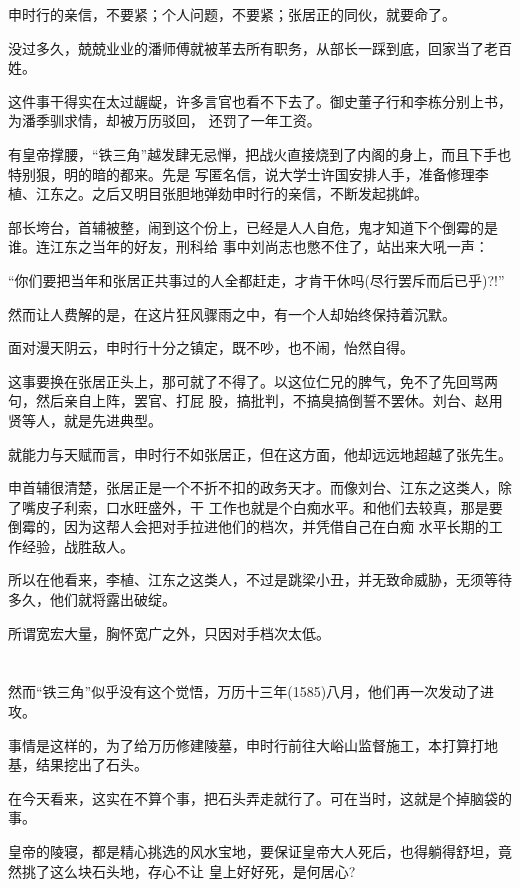 \documentclass[11pt,a4paper,onecolumn]{article}
\begin{document}
申时行的亲信，不要紧；个人问题，不要紧；张居正的同伙，就要命了。

没过多久，兢兢业业的潘师傅就被革去所有职务，从部长一踩到底，回家当了老百姓。

这件事干得实在太过龌龊，许多言官也看不下去了。御史董子行和李栋分别上书，为潘季驯求情，却被万历驳回，
还罚了一年工资。

有皇帝撑腰，``铁三角''越发肆无忌惮，把战火直接烧到了内阁的身上，而且下手也特别狠，明的暗的都来。先是
写匿名信，说大学士许国安排人手，准备修理李植、江东之。之后又明目张胆地弹劾申时行的亲信，不断发起挑衅。

部长垮台，首辅被整，闹到这个份上，已经是人人自危，鬼才知道下个倒霉的是谁。连江东之当年的好友，刑科给
事中刘尚志也憋不住了，站出来大吼一声：

``你们要把当年和张居正共事过的人全都赶走，才肯干休吗(尽行罢斥而后已乎)?!''

然而让人费解的是，在这片狂风骤雨之中，有一个人却始终保持着沉默。

面对漫天阴云，申时行十分之镇定，既不吵，也不闹，怡然自得。

这事要换在张居正头上，那可就了不得了。以这位仁兄的脾气，免不了先回骂两句，然后亲自上阵，罢官、打屁
股，搞批判，不搞臭搞倒誓不罢休。刘台、赵用贤等人，就是先进典型。

就能力与天赋而言，申时行不如张居正，但在这方面，他却远远地超越了张先生。

申首辅很清楚，张居正是一个不折不扣的政务天才。而像刘台、江东之这类人，除了嘴皮子利索，口水旺盛外，干
工作也就是个白痴水平。和他们去较真，那是要倒霉的，因为这帮人会把对手拉进他们的档次，并凭借自己在白痴
水平长期的工作经验，战胜敌人。

所以在他看来，李植、江东之这类人，不过是跳梁小丑，并无致命威胁，无须等待多久，他们就将露出破绽。

所谓宽宏大量，胸怀宽广之外，只因对手档次太低。

\section[\thesection]{}

然而``铁三角''似乎没有这个觉悟，万历十三年(1585)八月，他们再一次发动了进攻。

事情是这样的，为了给万历修建陵墓，申时行前往大峪山监督施工，本打算打地基，结果挖出了石头。

在今天看来，这实在不算个事，把石头弄走就行了。可在当时，这就是个掉脑袋的事。

皇帝的陵寝，都是精心挑选的风水宝地，要保证皇帝大人死后，也得躺得舒坦，竟然挑了这么块石头地，存心不让
皇上好好死，是何居心?
\end{document}
